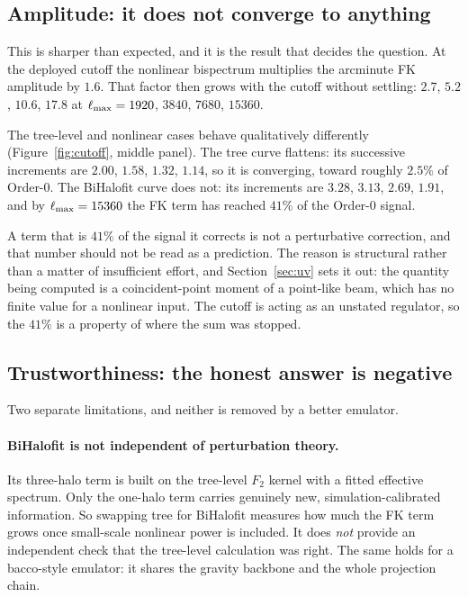 \subsection{Amplitude: it does not converge to anything}



This is sharper than expected, and it is the result that decides the
question. At the deployed cutoff the nonlinear bispectrum multiplies the
arcminute FK amplitude by $1.6$. That factor then grows with the cutoff
without settling: $2.7$, $5.2$, $10.6$, $17.8$ at
$\ell_{\max}=1920$, $3840$, $7680$, $15360$.

The tree-level and nonlinear cases behave qualitatively differently
(Figure~\ref{fig:cutoff}, middle panel). The tree curve flattens: its
successive increments are $2.00$, $1.58$, $1.32$, $1.14$, so it is
converging, toward roughly $2.5\%$ of Order-0. The BiHalofit curve does
not: its increments are $3.28$, $3.13$, $2.69$, $1.91$, and by
$\ell_{\max}=15360$ the FK term has reached $41\%$ of the Order-0 signal.

A term that is $41\%$ of the signal it corrects is not a perturbative
correction, and that number should not be read as a prediction. The reason
is structural rather than a matter of insufficient effort, and
Section~\ref{sec:uv} sets it out: the quantity being computed is a
coincident-point moment of a point-like beam, which has no finite value for
a nonlinear input. The cutoff is acting as an unstated regulator, so the
$41\%$ is a property of where the sum was stopped.

\subsection{Trustworthiness: the honest answer is negative}

Two separate limitations, and neither is removed by a better emulator.

\paragraph{BiHalofit is not independent of perturbation theory.} Its
three-halo term is built on the tree-level $F_2$ kernel with a fitted
effective spectrum. Only the one-halo term carries genuinely new,
simulation-calibrated information. So swapping tree for BiHalofit measures
how much the FK term grows once small-scale nonlinear power is included. It
does \emph{not} provide an independent check that the tree-level
calculation was right. The same holds for a bacco-style emulator: it shares
the gravity backbone and the whole projection chain.

